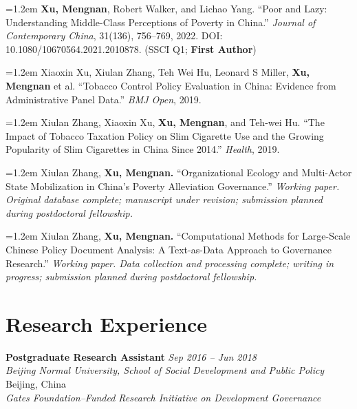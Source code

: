 \documentclass[11pt, letterpaper]{article}
\newcommand{\pubentry}[1]{%
  \noindent\hangindent=1.2em\hangafter=1 #1\par\vspace{4pt}
}
\begin{document}
\pubentry{\textbf{Xu, Mengnan}, Robert Walker, and Lichao Yang.
``Poor and Lazy: Understanding Middle-Class Perceptions of Poverty in China.''
\textit{Journal of Contemporary China}, 31(136), 756--769, 2022.
DOI: 10.1080/10670564.2021.2010878. (SSCI Q1; \textbf{First Author})}

\pubentry{Xiaoxin Xu, Xiulan Zhang, Teh Wei Hu, Leonard S Miller, \textbf{Xu, Mengnan} et al.
``Tobacco Control Policy Evaluation in China: Evidence from Administrative Panel Data.''
\textit{BMJ Open}, 2019.}

\pubentry{Xiulan Zhang, Xiaoxin Xu, \textbf{Xu, Mengnan}, and Teh-wei Hu.
``The Impact of Tobacco Taxation Policy on Slim Cigarette Use and the Growing Popularity of Slim Cigarettes in China Since 2014.''
\textit{Health}, 2019.}

\pubentry{Xiulan Zhang, \textbf{Xu, Mengnan.} ``Organizational Ecology and Multi-Actor
State Mobilization in China's Poverty Alleviation Governance.''
\textit{Working paper. Original database complete; manuscript under revision;
submission planned during postdoctoral fellowship.}}

\pubentry{Xiulan Zhang, \textbf{Xu, Mengnan.} ``Computational Methods for Large-Scale
Chinese Policy Document Analysis: A Text-as-Data Approach to Governance
Research.'' \textit{Working paper. Data collection and processing complete;
writing in progress; submission planned during postdoctoral fellowship.}}

\section{Research Experience}

\noindent\textbf{Postgraduate Research Assistant}
\hfill \textit{Sep 2016 -- Jun 2018}\\
\textit{Beijing Normal University, School of Social Development and Public Policy}
\hfill Beijing, China\\
\small\textit{Gates Foundation–Funded Research Initiative on Development Governance}
\end{document}

